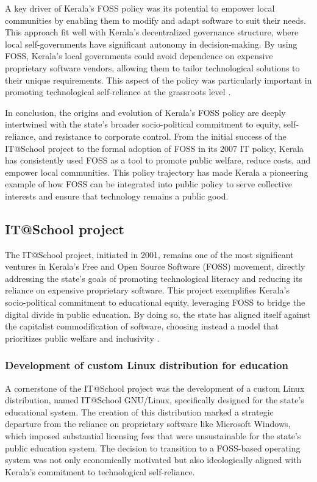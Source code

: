 \begin{refsection}
A key driver of Kerala’s FOSS policy was its potential to empower local communities by enabling them to modify and adapt software to suit their needs. This approach fit well with Kerala’s decentralized governance structure, where local self-governments have significant autonomy in decision-making. By using FOSS, Kerala’s local governments could avoid dependence on expensive proprietary software vendors, allowing them to tailor technological solutions to their unique requirements. This aspect of the policy was particularly important in promoting technological self-reliance at the grassroots level \cite[pp.~45-47]{isaac2000local}.

In conclusion, the origins and evolution of Kerala’s FOSS policy are deeply intertwined with the state’s broader socio-political commitment to equity, self-reliance, and resistance to corporate control. From the initial success of the IT@School project to the formal adoption of FOSS in its 2007 IT policy, Kerala has consistently used FOSS as a tool to promote public welfare, reduce costs, and empower local communities. This policy trajectory has made Kerala a pioneering example of how FOSS can be integrated into public policy to serve collective interests and ensure that technology remains a public good.

\subsection{IT@School project}

The IT@School project, initiated in 2001, remains one of the most significant ventures in Kerala's Free and Open Source Software (FOSS) movement, directly addressing the state’s goals of promoting technological literacy and reducing its reliance on expensive proprietary software. This project exemplifies Kerala's socio-political commitment to educational equity, leveraging FOSS to bridge the digital divide in public education. By doing so, the state has aligned itself against the capitalist commodification of software, choosing instead a model that prioritizes public welfare and inclusivity \cite[pp.~1-3]{prabhakar2010itschool}.

\subsubsection{Development of custom Linux distribution for education}

A cornerstone of the IT@School project was the development of a custom Linux distribution, named IT@School GNU/Linux, specifically designed for the state’s educational system. The creation of this distribution marked a strategic departure from the reliance on proprietary software like Microsoft Windows, which imposed substantial licensing fees that were unsustainable for the state’s public education system. The decision to transition to a FOSS-based operating system was not only economically motivated but also ideologically aligned with Kerala’s commitment to technological self-reliance.


\end{refsection}
